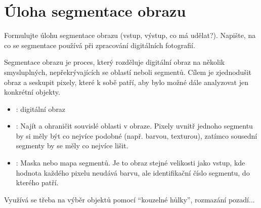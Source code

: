 \section{Úloha segmentace obrazu}
Formulujte úlohu segmentace obrazu (vstup, výstup, co má udělat?). Napište, na co se segmentace používá při 
zpracování digitálních fotografií.

Segmentace obrazu je proces, který rozděluje digitální obraz na několik smysluplných, nepřekrývajících se oblastí neboli 
segmentů. Cílem je zjednodušit obraz a seskupit pixely, které k sobě patří, aby bylo možné dále analyzovat jen konkrétní 
objekty.
\begin{itemize}
    \item {}: digitální obraz
    \item {}: Najít a ohraničit souvislé oblasti v obraze. Pixely uvnitř jednoho segmentu by si měly být co 
    nejvíce podobné (např. barvou, texturou), zatímco sousední segmenty by se měly co nejvíce lišit.
    \item {}: Maska nebo mapa segmentů. Je to obraz stejné velikosti jako vstup, kde hodnota každého pixelu 
    neudává barvu, ale identifikační číslo segmentu, do kterého patří.
\end{itemize}
Využívá se třeba na výběr objektů pomocí \enquote{kouzelné hůlky}, rozmazání pozadí...